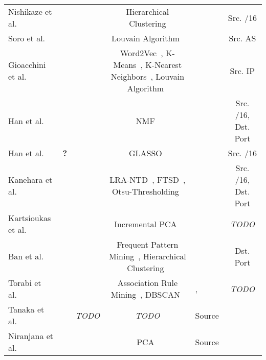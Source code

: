 \documentclass[manuscript,nonacm]{acmart}
\newcommand{\markA}{\ding{66}}%
\newcommand{\markB}{\ding{71}}%
\newcommand{\markD}{\ding{168}}%
\newcommand{\markE}{\ding{169}}%
\newcommand{\markF}{\ding{170}}%
\newcommand{\markG}{\ding{171}}%
\newcommand{\markH}{\ding{92}}%
\newcommand{\markJ}{\ding{166}}%
\newcommand{\markX}{\Sagittarius} %
\newcommand{\markEtc}{\textbf{?}}
\begin{document}
\begin{table}[]
\begin{tabular}{lllclc}
            Nishikaze et al.~\cite{2015nishikaze}                  & \markX                    & \markB        & Hierarchical Clustering           & \markE & Src. /16  \\
            Soro et al.~\cite{2020soro}                            & \markX                    & \markB        & Louvain Algorithm~\cite{2006newman,2008blondel} & \markF & Src. AS   \\
            Gioacchini et al.~\cite{2021gioacchini,2023gioacchini} & \markX                    & \markA\markB  & Word2Vec~\cite{2013mikolov}, K-Means~\cite{1967macqueen}, K-Nearest Neighbors~\cite{1967cover,1989fix}, Louvain Algorithm~\cite{2006newman,2008blondel} & \markF & Src. IP   \\
            Han et al.~\cite{2021han,2022han}                      & \markX                    & \markA        & NMF~\cite{2000lee}    & \markG & Src. /16, Dst. Port \\
            Han et al.~\cite{2020han,2022han}                      & \markX\markEtc            & \markA        & GLASSO~\cite{2008friedman} & \markG & Src. /16  \\
            Kanehara et al.~\cite{2019kanehara,2022han}            & \markX                    & \markA\markH  & LRA-NTD~\cite{2015zhou}, FTSD~\cite{2010caiafa}, Otsu-Thresholding~\cite{1979otsu}          & \markG & Src. /16, Dst. Port \\
            Kartsioukas et al.~\cite{2023kartsioukas}              & \markX                    & \markA\markH  & Incremental PCA~\cite{2012arora} & \markG & \textit{TODO} \\
            Ban et al.~\cite{2016ban}                              & \markX                    & \markA        & Frequent Pattern Mining~\cite{2000han,2007han}, Hierarchical Clustering~\cite{2012murtagh}  & \markF\markG & Dst. Port \\ 
            Torabi et al.~\cite{2020torabi,2018torabi}             & \markX                    & \markJ        & Association Rule Mining~\cite{1993agrawal}, DBSCAN~\cite{1996ester} & \markD,\markE & \textit{TODO} \\
            Tanaka et al.~\cite{2023tanaka,2021tanaka}             & \markX                    & \textit{TODO} & \textit{TODO} & Source \\
            Niranjana et al.~\cite{2019niranjana}                  & \markX                    & \markA\markB  & PCA~\cite{1901pearson,1993hotelling} &  Source \\

\end{tabular}
\end{table}
\end{document}
